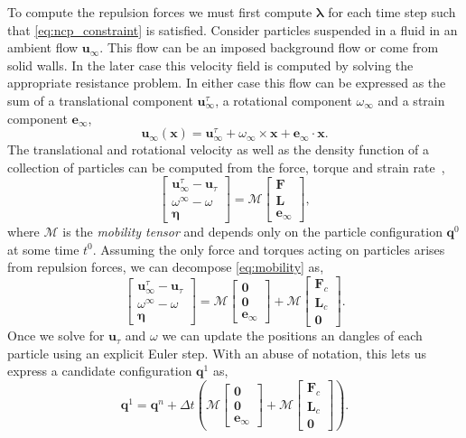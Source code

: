 \documentclass[preprint, 10pt]{elsarticle}
\begin{document}
To compute the repulsion forces we must first compute $\pmb{\lambda}$ for each
time step such that \eqref{eq:ncp_constraint} is satisfied.
Consider particles suspended in a fluid in an ambient flow $\mathbf{u}_\infty$.
This flow can be an imposed background flow or come from solid walls. In the
later case this velocity field is computed by solving the appropriate resistance problem. In either case this flow can be expressed as the sum of a translational component $\mathbf{u}_{\infty}^\tau$, a rotational component $\omega_{\infty}$ and a strain component $\mathbf{e}_{\infty}$,
\[ \mathbf{u}_{\infty}(\mathbf{x}) = \mathbf{u}_{\infty}^\tau +
\omega_\infty\times \mathbf{x} + \mathbf{e}_\infty \cdot\mathbf{x}.\]
The translational and rotational velocity as well as the density
function of a collection of particles can be computed from the force,
torque and strain rate~\cite{Karrila1991},
\begin{equation}\label{eq:mobility} \begin{bmatrix} \mathbf{u}_\infty^\tau -
\mathbf{u}_\tau\\ \omega^\infty - \omega \\\pmb{\eta}\end{bmatrix} =
\mathcal{M}\begin{bmatrix}\mathbf{F}\\\mathbf{L}\\\mathbf{e}_\infty\end{bmatrix},\end{equation}
where $\mathcal{M}$ is the {\em mobility tensor} and depends only on the
particle configuration $\mathbf{q}^0$ at some time $t^0$. Assuming the
only force and torques acting on particles arises from repulsion forces,
we can decompose \eqref{eq:mobility} as,
\[ \begin{bmatrix} \mathbf{u}_\infty^\tau - \mathbf{u}_\tau\\ \omega^\infty -
\omega \\\pmb{\eta}\end{bmatrix} =
\mathcal{M}\begin{bmatrix}\mathbf{0}\\\mathbf{0}\\\mathbf{e}_\infty\end{bmatrix}+
\mathcal{M}\begin{bmatrix}\mathbf{F}_c\\\mathbf{L}_c\\\mathbf{0}\end{bmatrix}.\]
Once we solve for $\mathbf{u}_\tau$ and $\omega$ we can update the positions an dangles of each particle using an explicit Euler step. With an abuse of notation,
this lets us express a candidate configuration $\mathbf{q}^{1}$ as,
\[ \mathbf{q}^{1} = \mathbf{q}^n + \Delta
t\left(\mathcal{M}\begin{bmatrix}\mathbf{0}\\\mathbf{0}\\\mathbf{e}_\infty\end{bmatrix}
+
\mathcal{M}\begin{bmatrix}\mathbf{F}_c\\\mathbf{L}_c\\\mathbf{0}\end{bmatrix}\right).\]
\end{document}
